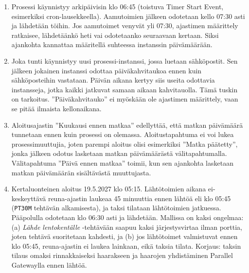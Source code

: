 \documentclass[
  finnish,
  letterpaper,
  DIV=11,
  numbers=noendperiod,
  oneside]{scrreprt}
\providecommand{\tightlist}{%
  \setlength{\itemsep}{0pt}\setlength{\parskip}{0pt}}
\begin{document}
\begin{tcolorbox}[enhanced jigsaw, arc=.35mm, bottomrule=.15mm, bottomtitle=1mm, breakable, colback=white, colbacktitle=quarto-callout-tip-color!10!white, colframe=quarto-callout-tip-color-frame, coltitle=black, left=2mm, leftrule=.75mm, opacityback=0, opacitybacktitle=0.6, rightrule=.15mm, title=\textcolor{quarto-callout-tip-color}{\faLightbulb}\hspace{0.5em}{Malliratkaisu}, titlerule=0mm, toprule=.15mm, toptitle=1mm]

\begin{enumerate}
\def\labelenumi{\arabic{enumi}.}
\tightlist
\item
  Prosessi käynnistyy arkipäivisin klo 06:45 (toistuva Timer Start
  Event, esimerkiksi cron-lausekkeella). Aamutoimien jälkeen odotetaan
  kello 07:30 asti ja lähdetään töihin. Jos aamutoimet venyvät yli
  07:30, ajastimen määrittely ratkaisee, lähdetäänkö heti vai
  odotetaanko seuraavaan kertaan. Siksi ajankohta kannattaa määritellä
  suhteessa instanssin päivämäärään.
\item
  Joka tunti käynnistyy uusi prosessi-instanssi, jossa luetaan
  sähköpostit. Sen jälkeen jokainen instanssi odottaa päiväkahvitaukoa
  ennen kuin sähköposteihin vastataan. Päivän aikana kertyy siis useita
  odottavia instansseja, jotka kaikki jatkuvat samaan aikaan
  kahvitauolla. Tämä tuskin on tarkoitus. ''Päiväkahvitauko'' ei
  myöskään ole ajastimen määrittely, vaan se pitää ilmaista
  kellonaikana.
\item
  Aloitusajastin ''Kuukausi ennen matkaa'' edellyttää, että matkan
  päivämäärä tunnetaan ennen kuin prosessi on olemassa. Aloitustapahtuma
  ei voi lukea prosessimuuttujia, joten parempi aloitus olisi
  esimerkiksi ''Matka päätetty'', jonka jälkeen odotus lasketaan matkan
  päivämäärästä välitapahtumalla. Välitapahtuma ''Päivä ennen matkaa''
  toimii, kun sen ajankohta lasketaan matkan päivämäärän sisältävästä
  muuttujasta.
\item
  Kertaluonteinen aloitus 19.5.2027 klo 05:15. Lähtötoimien aikana
  ei-keskeyttävä reuna-ajastin laukeaa 45 minuuttia ennen lähtöä eli klo
  05:45 (\texttt{PT30M} tehtävän alkamisesta), ja taksi tilataan
  lähtötoimien jatkuessa. Pääpolulla odotetaan klo 06:30 asti ja
  lähdetään. Mallissa on kaksi ongelmaa: (a) \emph{Lähde lentokentälle}
  -tehtävään saapuu kaksi järjestysvirtaa ilman porttia, joten tehtävä
  suoritetaan kahdesti, ja (b) jos lähtötoimet valmistuvat ennen klo
  05:45, reuna-ajastin ei laukea lainkaan, eikä taksia tilata. Korjaus:
  taksin tilaus omaksi rinnakkaiseksi haarakseen ja haarojen
  yhdistäminen Parallel Gatewaylla ennen lähtöä.
\end{enumerate}

\end{tcolorbox}
\end{document}
